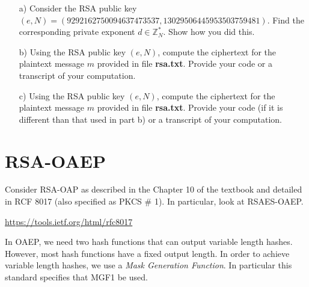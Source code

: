 \documentclass[12pt, letterpaper]{article}
\newcommand{\bgreen}[1]{\textbf{\textcolor{green!50!black}{#1}}}
\begin{document}
\begin{itemize}

\item[a)] Consider the RSA public key 
$(e,N) = (9292162750094637473537, 13029506445953503759481)$.
Find the corresponding private exponent $d \in \mathbb{Z}_N^*$.  
Show how you did this. 



\item[b)] Using the RSA public key $(e,N)$, compute the ciphertext for the plaintext message $m$ provided in 
file \bgreen{rsa.txt}.
Provide your code or a transcript of your computation.


\item[c)] Using the RSA public key $(e,N)$, compute the ciphertext for the plaintext message $m$ provided in 
file \bgreen{rsa.txt}.
Provide your code (if it is different than that used in part b) 
or a transcript of your computation.




\end{itemize}

\newpage

\section{RSA-OAEP}

Consider RSA-OAP as described in the Chapter 10 of the textbook and detailed in RCF 8017 (also specified as PKCS \# 1). In particular, look at RSAES-OAEP. 

\medskip

\url{https://tools.ietf.org/html/rfc8017}

\medskip

In OAEP, we need two hash functions that can output variable length hashes. However, most hash functions have a fixed output length. In order to achieve variable length hashes, we use a \emph{Mask Generation Function}. In particular this standard specifies that MGF1 be used. 
\end{document}
